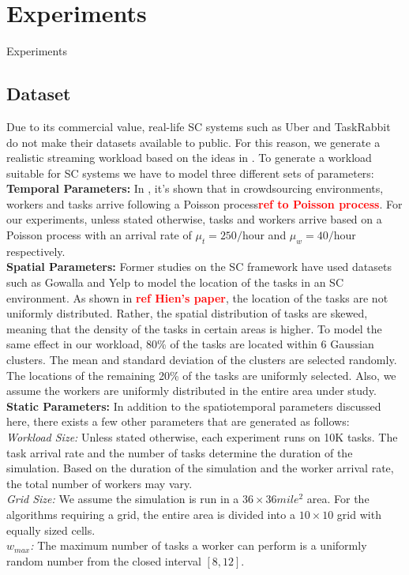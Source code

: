 \section{Experiments}

Experiments

\subsection{Dataset}
Due to its commercial value, real-life SC systems such as Uber and TaskRabbit do not make their datasets available to public. For this reason, we generate a realistic streaming workload based on the ideas in \cite{Tang07}. To generate a workload suitable for SC systems we have to model three different sets of parameters:\\
\textbf{Temporal Parameters:} In \cite{Basu15}, it's shown that in crowdsourcing environments, workers and tasks arrive following a Poisson process\textcolor{red}{\textbf{ref to Poisson process}}. For our experiments, unless stated otherwise, tasks and workers arrive based on a Poisson process with an arrival rate of $\mu_t = 250/$hour and $\mu_w = 40/$hour respectively.\\
\textbf{Spatial Parameters:} Former studies on the SC framework \cite{Kazemi12, Kazemi13, Deng13} have used datasets such as Gowalla and Yelp  to model the location of the tasks in an SC environment. As shown in \textcolor{red}{\textbf{ref Hien's paper}}, the location of the tasks are not uniformly distributed. Rather, the spatial distribution of tasks are skewed, meaning that the density of the tasks in certain areas is higher. To model the same effect in our workload, 80\% of the tasks are located within 6 Gaussian clusters. The mean and standard deviation of the clusters are selected randomly. The locations of the remaining 20\% of the tasks are uniformly selected. Also, we assume the workers are uniformly distributed in the entire area under study.\\
\textbf{Static Parameters:} In addition to the spatiotemporal parameters discussed here, there exists a few other parameters that are generated as follows:\\
\emph{Workload Size:} Unless stated otherwise, each experiment runs on 10K tasks. The task arrival rate and the number of tasks determine the duration of the simulation. Based on the duration of the simulation and the worker arrival rate, the total number of workers may vary.\\
\emph{Grid Size:} We assume the simulation is run in a $36 \times 36 mile^2$ area. For the algorithms requiring a grid, the entire area is divided into a $10 \times 10$ grid with equally sized cells.\\
\emph{$w_{max}$:} The maximum number of tasks a worker can perform is a uniformly random number from the closed interval $\left[8,12 \right]$.
